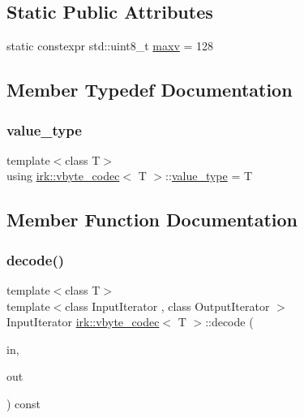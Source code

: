 \subsection*{Static Public Attributes}
\begin{DoxyCompactItemize}
\item 
static constexpr std\+::uint8\+\_\+t \mbox{\hyperlink{structirk_1_1vbyte__codec_ae5d8ab43b690ec1925bf1e59593fd66f}{maxv}} = 128
\end{DoxyCompactItemize}


\subsection{Member Typedef Documentation}
\mbox{\label{structirk_1_1vbyte__codec_aa59c947ce3a8b15f476295fe4b944f99}} 
\subsubsection{\texorpdfstring{value\+\_\+type}{value\_type}}
{\footnotesize\ttfamily template$<$class T$>$ \\
using \mbox{\hyperlink{structirk_1_1vbyte__codec}{irk\+::vbyte\+\_\+codec}}$<$ T $>$\+::\mbox{\hyperlink{structirk_1_1vbyte__codec_aa59c947ce3a8b15f476295fe4b944f99}{value\+\_\+type}} =  T}



\subsection{Member Function Documentation}
\mbox{\label{structirk_1_1vbyte__codec_a5de271838b06bde6458d12d417d570c9}} 
\subsubsection{\texorpdfstring{decode()}{decode()}\hspace{0.1cm}{\footnotesize\ttfamily [1/2]}}
{\footnotesize\ttfamily template$<$class T$>$ \\
template$<$class Input\+Iterator , class Output\+Iterator $>$ \\
Input\+Iterator \mbox{\hyperlink{structirk_1_1vbyte__codec}{irk\+::vbyte\+\_\+codec}}$<$ T $>$\+::decode (\begin{DoxyParamCaption}\item[{Input\+Iterator}]{in,  }\item[{Output\+Iterator}]{out }\end{DoxyParamCaption}) const\hspace{0.3cm}{\ttfamily [inline]}}

